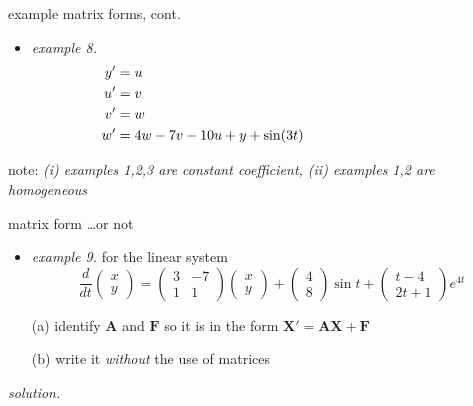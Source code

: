 \documentclass[dvipsnames,colorlinks]{beamer}
\newcommand{\bA}{\mathbf{A}}
\newcommand{\bF}{\mathbf{F}}
\newcommand{\bX}{\mathbf{X}}
\begin{document}
\begin{frame}{example matrix forms, cont.}

\small
\begin{itemize}
\item \emph{example 8.}
\begin{align*}
y' &= u \hspace{75mm} \\
u' &= v \\
v' &= w \\
w' &= 4w-7v-10u+y+\sin(3t)
\end{align*}
\end{itemize}

\vspace{30mm}
\scriptsize note: \emph{(i) examples 1,2,3 are constant coefficient, (ii) examples 1,2 are homogeneous}
\end{frame}


\begin{frame}{matrix form \dots or not}

\begin{itemize}
\item \emph{example 9.}  for the linear system
    $$\frac{d}{dt} \begin{pmatrix} x \\ y \end{pmatrix} =  \begin{pmatrix} 3 & -7 \\ 1 & 1 \end{pmatrix} \begin{pmatrix} x \\ y \end{pmatrix} + \begin{pmatrix} 4 \\ 8 \end{pmatrix} \sin t + \begin{pmatrix} t-4 \\ 2t+1 \end{pmatrix} e^{4t}$$

(a) identify $\bA$ and $\bF$ so it is in the form $\bX'=\bA\bX+\bF$

(b) write it \emph{without} the use of matrices
\end{itemize}

\noindent \emph{solution.}

\vspace{50mm}
\end{frame}
\end{document}

